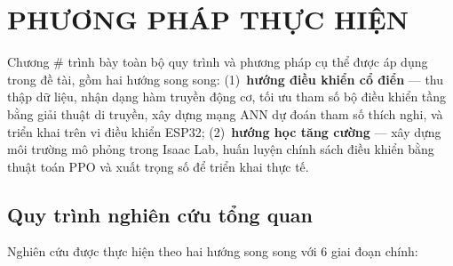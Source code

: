 
\chapter{PHƯƠNG PHÁP THỰC HIỆN}
\label{chap:phuongphap}

Chương # trình bày toàn bộ quy trình và phương pháp cụ thể được áp dụng
trong đề tài, gồm hai hướng song song: (1)~\textbf{hướng điều khiển cổ điển}
— thu thập dữ liệu, nhận dạng hàm truyền động cơ, tối ưu tham số bộ điều
khiển tầng bằng giải thuật di truyền, xây dựng mạng ANN dự đoán tham số
thích nghi, và triển khai trên vi điều khiển ESP32; (2)~\textbf{hướng học
tăng cường} — xây dựng môi trường mô phỏng trong Isaac Lab, huấn luyện
chính sách điều khiển bằng thuật toán PPO và xuất trọng số để triển khai
thực tế.


\section{Quy trình nghiên cứu tổng quan}

Nghiên cứu được thực hiện theo hai hướng song song với 6 giai đoạn chính:

